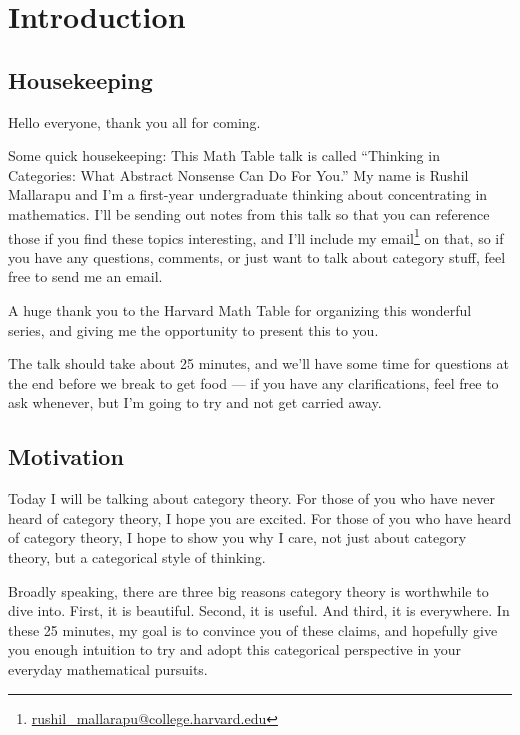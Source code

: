 \documentclass{notes}
\begin{document}
\section{Introduction}

\vspace{-3ex}

\subsection{Housekeeping}

\vspace{-3ex}
Hello everyone, thank you all for coming.

\vspace{-8.5ex}
Some quick housekeeping: This Math Table talk is called ``Thinking in Categories: What Abstract Nonsense Can Do For You.'' My name is Rushil Mallarapu and I’m a first-year undergraduate thinking about concentrating in mathematics. I’ll be sending out notes from this talk so that you can reference those if you find these topics interesting, and I’ll include my email\footnote{\href{mailto:rushil\_mallarapu@college.harvard.edu}{rushil\_mallarapu@college.harvard.edu}} on that, so if you have any questions, comments, or just want to talk about category stuff, feel free to send me an email.

\vspace{-8.5ex}
A huge thank you to the Harvard Math Table for organizing this wonderful series, and giving me the opportunity to present this to you.

\vspace{-8.5ex}
The talk should take about 25 minutes, and we’ll have some time for questions at the end before we break to get food — if you have any clarifications, feel free to ask whenever, but I’m going to try and not get carried away.

\subsection{Motivation}

\vspace{-3ex}
Today I will be talking about category theory. For those of you who have never heard of category theory, I hope you are excited. For those of you who have heard of category theory, I hope to show you why I care, not just about category theory, but a categorical style of thinking.

\vspace{-8.5ex}
Broadly speaking, there are three big reasons category theory is worthwhile to dive into. First, it is beautiful. Second, it is useful. And third, it is everywhere. In these 25 minutes, my goal is to convince you of these claims, and hopefully give you enough intuition to try and adopt this categorical perspective in your everyday mathematical pursuits.
\end{document}
